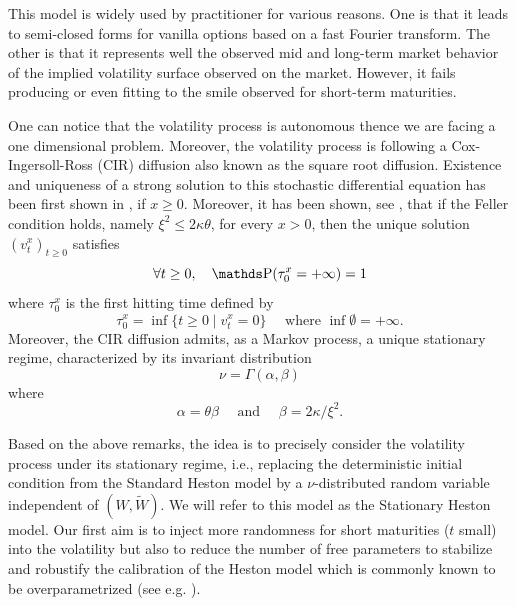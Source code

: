 This model is widely used by practitioner for various reasons. One is that it leads to semi-closed forms for vanilla options based on a fast Fourier transform. The other is that it represents well the observed mid and long-term market behavior of the implied volatility surface observed on the market. However, it fails producing or even fitting to the smile observed for short-term maturities.


\begin{remark} \label{RH:remark::vol}

	One can notice that the volatility process is autonomous thence we are facing a one dimensional problem. Moreover, the volatility process is following a Cox-Ingersoll-Ross (CIR) diffusion also known as the square root diffusion.
	Existence and uniqueness of a strong solution to this stochastic differential equation has been first shown in \cite{ikeda1981stochastic}, if $x \geq 0$. Moreover, it has been shown, see \cite{lamberton2011introduction}, that if the Feller condition holds, namely $\xi^2 \leq 2 \kappa \theta$, for every $x > 0$, then the unique solution $(v_t^x)_{t \geq 0}$ satisfies
	\begin{equation}
		\forall t \geq 0, \quad \Prob ( \tau_0^x = + \infty ) = 1
	\end{equation}
	where $\tau_0^x$ is the first hitting time defined by
	\begin{equation}
		\tau_0^x = \inf \{ t \geq 0 \mid v_t^x = 0 \} \quad \mbox{ where } \inf \emptyset = + \infty.
	\end{equation}
	Moreover, the CIR diffusion admits, as a Markov process, a unique stationary regime, characterized by its invariant distribution
	\begin{equation}\label{RH:gammalaw}
		\nu = \Gamma(\alpha, \beta)
	\end{equation}
	where
	\begin{equation}\label{RH:params_gammalaw}
		\alpha = \theta \beta \quad \mbox{ and }\quad \beta = 2 \kappa / \xi^2.
	\end{equation}

\end{remark}

\medskip
Based on the above remarks, the idea is to precisely consider the volatility process under its stationary regime, i.e., replacing the deterministic initial condition from the Standard Heston model by a $\nu$-distributed random variable independent of $(W, \widetilde W)$. We will refer to this model as the Stationary Heston model. Our first aim is to inject more randomness for short maturities ($t$ small) into the volatility but also to reduce the number of free parameters to stabilize and robustify the calibration of the Heston model which is commonly known to be overparametrized (see e.g. \cite{gauthier2009fitting}).

